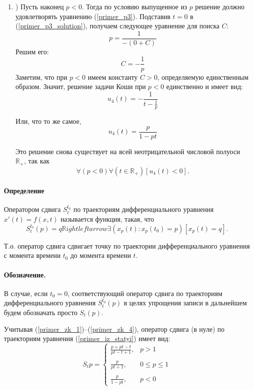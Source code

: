 \begin{enumerate}
\item)
Пусть наконец $p<0$.
Тогда по условию выпущенное из $p$ решение должно удовлетворять уравнению (\ref{primer_p3}).
Подставив $t=0$ в (\ref{primer_p3_solution}), получаем следующее уравнение для поиска $C$:
$$
	p=\frac{1}{-(0+C)}
$$
Решим его:
$$
	C=-\frac{1}{p}
$$
Заметим, что при $p<0$ имеем константу $C>0$, определяемую единственным образом.
Значит, решение задачи Коши при $p<0$ единственно и имеет вид:
\begin{equation}\label{primer_zk_4_0}
	u_4(t)=-\frac{1}{t-\frac{1}{p}}
\end{equation}

Или, что то же самое,
\begin{equation}\label{primer_zk_4}
	u_4(t)=\frac{p}{1-pt}
\end{equation}

Это решение снова существует на всей неотрицательной числовой полуоси $\mathbb{R}_+$, так как
$$
	\forall(p<0)\forall\left(t \in \mathbb{R}_+\right)\left[u_4(t) < 0\right].
$$

\end{enumerate}

\paragraph{Определение}
Оператором сдвига $S^{t_0}_t$ по траекториям дифференциального уравнения $x'(t) = f(x,t)$ называется функция, такая, что
\begin{equation*}
	S^{t_0}_t (p) = q \mathbb{R}ightleftarrow
		\exists\left(x_p(t) : x_p(t_0) = p\right)\left[x_p(t) = q\right].
\end{equation*}

Т.о. оператор сдвига сдвигает точку по траектории дифференциального уравнения с момента времени $t_0$ до момента времени $t$.

\paragraph{Обозначение.}
В случае, если $t_0=0$, соответствующий оператор сдвига по траекториям дифференциального уравнения $S^{t_0}_t (p)$ в целях упрощения записи  в дальнейшем будем обозначать просто $S_t (p)$.

Учитывая (\ref{primer_zk_1})--(\ref{primer_zk_4}), оператор сдвига (в нуле) по траекториям уравнения (\ref{primer_iz_statyi}) имеет вид:
\begin{equation}\label{oper_sdviga_primer_1}
	S_t p =
	\left\{
		\begin{array}{ll}
			\frac{p+pt-t}{pt-t+1}, & p > 1
		\\\\
			\frac{p}{pt+1},        & 0 \leq p \leq 1
		\\\\
			\frac{p}{1 - pt},      & p < 0
		\end{array}
	\right.
\end{equation}


